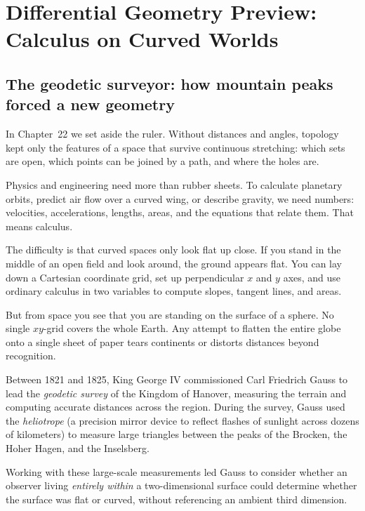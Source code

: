 \section{Differential Geometry Preview: Calculus on Curved Worlds}
\chapterline

\subsection{The geodetic surveyor: how mountain peaks forced a new geometry}

In Chapter~22 we set aside the ruler. Without distances and angles, topology kept only the features of a space that survive continuous stretching: which sets are open, which points can be joined by a path, and where the holes are.

Physics and engineering need more than rubber sheets. To calculate planetary orbits, predict air flow over a curved wing, or describe gravity, we need numbers: velocities, accelerations, lengths, areas, and the equations that relate them. That means calculus.

The difficulty is that curved spaces only look flat up close. If you stand in the middle of an open field and look around, the ground appears flat. You can lay down a Cartesian coordinate grid, set up perpendicular $x$ and $y$ axes, and use ordinary calculus in two variables to compute slopes, tangent lines, and areas.

But from space you see that you are standing on the surface of a sphere. No single $xy$-grid covers the whole Earth. Any attempt to flatten the entire globe onto a single sheet of paper tears continents or distorts distances beyond recognition.

Between 1821 and 1825, King George IV commissioned Carl Friedrich Gauss to lead the \emph{geodetic survey} of the Kingdom of Hanover, measuring the terrain and computing accurate distances across the region. During the survey, Gauss used the \emph{heliotrope} (a precision mirror device to reflect flashes of sunlight across dozens of kilometers) to measure large triangles between the peaks of the Brocken, the Hoher Hagen, and the Inselsberg.

Working with these large-scale measurements led Gauss to consider whether an observer living \emph{entirely within} a two-dimensional surface could determine whether the surface was flat or curved, without referencing an ambient third dimension.

